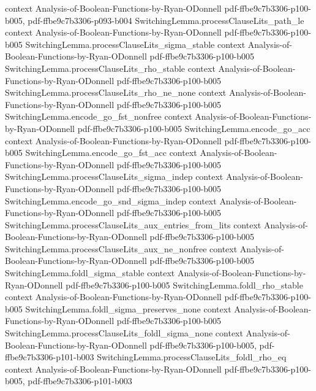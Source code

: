 \begin{lemma}
  {context}
  {Analysis-of-Boolean-Functions-by-Ryan-ODonnell}
  {pdf-ffbe9c7b3306-p100-b005,
    pdf-ffbe9c7b3306-p093-b004}
\proofstep
  {SwitchingLemma.processClauseLits_path_le}
  {context}
  {Analysis-of-Boolean-Functions-by-Ryan-ODonnell}
  {pdf-ffbe9c7b3306-p100-b005}
\proofstep
  {SwitchingLemma.processClauseLits_sigma_stable}
  {context}
  {Analysis-of-Boolean-Functions-by-Ryan-ODonnell}
  {pdf-ffbe9c7b3306-p100-b005}
\proofstep
  {SwitchingLemma.processClauseLits_rho_stable}
  {context}
  {Analysis-of-Boolean-Functions-by-Ryan-ODonnell}
  {pdf-ffbe9c7b3306-p100-b005}
\proofstep
  {SwitchingLemma.processClauseLits_rho_ne_none}
  {context}
  {Analysis-of-Boolean-Functions-by-Ryan-ODonnell}
  {pdf-ffbe9c7b3306-p100-b005}
\proofstep
  {SwitchingLemma.encode_go_fst_nonfree}
  {context}
  {Analysis-of-Boolean-Functions-by-Ryan-ODonnell}
  {pdf-ffbe9c7b3306-p100-b005}
\proofstep
  {SwitchingLemma.encode_go_acc}
  {context}
  {Analysis-of-Boolean-Functions-by-Ryan-ODonnell}
  {pdf-ffbe9c7b3306-p100-b005}
\proofstep
  {SwitchingLemma.encode_go_fst_acc}
  {context}
  {Analysis-of-Boolean-Functions-by-Ryan-ODonnell}
  {pdf-ffbe9c7b3306-p100-b005}
\proofstep
  {SwitchingLemma.processClauseLits_sigma_indep}
  {context}
  {Analysis-of-Boolean-Functions-by-Ryan-ODonnell}
  {pdf-ffbe9c7b3306-p100-b005}
\proofstep
  {SwitchingLemma.encode_go_snd_sigma_indep}
  {context}
  {Analysis-of-Boolean-Functions-by-Ryan-ODonnell}
  {pdf-ffbe9c7b3306-p100-b005}
\proofstep
  {SwitchingLemma.processClauseLits_aux_entries_from_lits}
  {context}
  {Analysis-of-Boolean-Functions-by-Ryan-ODonnell}
  {pdf-ffbe9c7b3306-p100-b005}
\proofstep
  {SwitchingLemma.processClauseLits_aux_ne_nonfree}
  {context}
  {Analysis-of-Boolean-Functions-by-Ryan-ODonnell}
  {pdf-ffbe9c7b3306-p100-b005}
\proofstep
  {SwitchingLemma.foldl_sigma_stable}
  {context}
  {Analysis-of-Boolean-Functions-by-Ryan-ODonnell}
  {pdf-ffbe9c7b3306-p100-b005}
\proofstep
  {SwitchingLemma.foldl_rho_stable}
  {context}
  {Analysis-of-Boolean-Functions-by-Ryan-ODonnell}
  {pdf-ffbe9c7b3306-p100-b005}
\proofstep
  {SwitchingLemma.foldl_sigma_preserves_none}
  {context}
  {Analysis-of-Boolean-Functions-by-Ryan-ODonnell}
  {pdf-ffbe9c7b3306-p100-b005}
\proofstep
  {SwitchingLemma.processClauseLits_foldl_sigma_none}
  {context}
  {Analysis-of-Boolean-Functions-by-Ryan-ODonnell}
  {pdf-ffbe9c7b3306-p100-b005,
    pdf-ffbe9c7b3306-p101-b003}
\proofstep
  {SwitchingLemma.processClauseLits_foldl_rho_eq}
  {context}
  {Analysis-of-Boolean-Functions-by-Ryan-ODonnell}
  {pdf-ffbe9c7b3306-p100-b005,
    pdf-ffbe9c7b3306-p101-b003}

\end{lemma}

